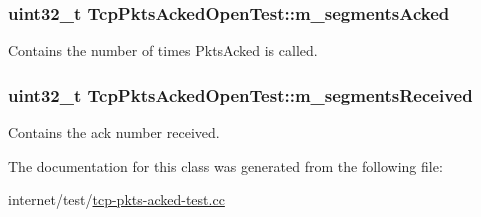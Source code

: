 \subsubsection[{\texorpdfstring{m\+\_\+segments\+Acked}{m_segmentsAcked}}]{\setlength{\rightskip}{0pt plus 5cm}uint32\+\_\+t Tcp\+Pkts\+Acked\+Open\+Test\+::m\+\_\+segments\+Acked\hspace{0.3cm}{\ttfamily [private]}}\hypertarget{classTcpPktsAckedOpenTest_a2f728e94faf7afe3de132209f345f605}{}\label{classTcpPktsAckedOpenTest_a2f728e94faf7afe3de132209f345f605}


Contains the number of times Pkts\+Acked is called. 

\subsubsection[{\texorpdfstring{m\+\_\+segments\+Received}{m_segmentsReceived}}]{\setlength{\rightskip}{0pt plus 5cm}uint32\+\_\+t Tcp\+Pkts\+Acked\+Open\+Test\+::m\+\_\+segments\+Received\hspace{0.3cm}{\ttfamily [private]}}\hypertarget{classTcpPktsAckedOpenTest_aebb57f034188608f80f001e0dda8d2c8}{}\label{classTcpPktsAckedOpenTest_aebb57f034188608f80f001e0dda8d2c8}


Contains the ack number received. 



The documentation for this class was generated from the following file\+:\begin{DoxyCompactItemize}
\item 
internet/test/\hyperlink{tcp-pkts-acked-test_8cc}{tcp-\/pkts-\/acked-\/test.\+cc}\end{DoxyCompactItemize}
